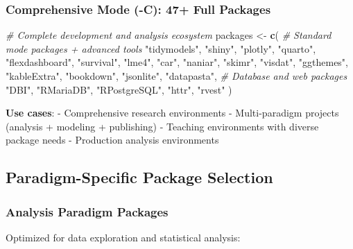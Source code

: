 \documentclass[
]{article}
\newenvironment{Shaded}{\begin{snugshade}}{\end{snugshade}}
\newcommand{\CommentTok}[1]{\textcolor[rgb]{0.56,0.35,0.01}{\textit{#1}}}
\newcommand{\FunctionTok}[1]{\textcolor[rgb]{0.13,0.29,0.53}{\textbf{#1}}}
\newcommand{\NormalTok}[1]{#1}
\newcommand{\OtherTok}[1]{\textcolor[rgb]{0.56,0.35,0.01}{#1}}
\newcommand{\StringTok}[1]{\textcolor[rgb]{0.31,0.60,0.02}{#1}}
\begin{document}
\subsubsection{Comprehensive Mode (-C): 47+ Full
Packages}\label{comprehensive-mode--c-47-full-packages}

\begin{Shaded}
\begin{Highlighting}[]
\CommentTok{\# Complete development and analysis ecosystem}
\NormalTok{packages }\OtherTok{\textless{}{-}} \FunctionTok{c}\NormalTok{(}
  \CommentTok{\# Standard mode packages + advanced tools}
  \StringTok{"tidymodels"}\NormalTok{, }\StringTok{"shiny"}\NormalTok{, }\StringTok{"plotly"}\NormalTok{, }\StringTok{"quarto"}\NormalTok{,}
  \StringTok{"flexdashboard"}\NormalTok{, }\StringTok{"survival"}\NormalTok{, }\StringTok{"lme4"}\NormalTok{, }\StringTok{"car"}\NormalTok{,}
  \StringTok{"naniar"}\NormalTok{, }\StringTok{"skimr"}\NormalTok{, }\StringTok{"visdat"}\NormalTok{, }\StringTok{"ggthemes"}\NormalTok{,}
  \StringTok{"kableExtra"}\NormalTok{, }\StringTok{"bookdown"}\NormalTok{, }\StringTok{"jsonlite"}\NormalTok{, }\StringTok{"datapasta"}\NormalTok{,}
  \CommentTok{\# Database and web packages}
  \StringTok{"DBI"}\NormalTok{, }\StringTok{"RMariaDB"}\NormalTok{, }\StringTok{"RPostgreSQL"}\NormalTok{, }\StringTok{"httr"}\NormalTok{, }\StringTok{"rvest"}
\NormalTok{)}
\end{Highlighting}
\end{Shaded}

\textbf{Use cases}: - Comprehensive research environments -
Multi-paradigm projects (analysis + modeling + publishing) - Teaching
environments with diverse package needs - Production analysis
environments

\subsection{Paradigm-Specific Package
Selection}\label{paradigm-specific-package-selection}

\subsubsection{Analysis Paradigm
Packages}\label{analysis-paradigm-packages}

Optimized for data exploration and statistical analysis:
\end{document}

